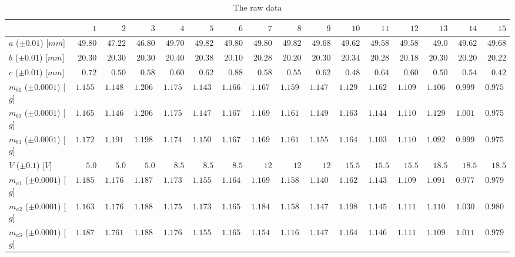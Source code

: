 \documentclass[a4paper]{article}
\begin{document}
\begin{landscape}

  \begin{table}
    \centering
    \begin{tabular}{l | r | r | r | r | r | r | r | r | r | r | r | r | r | r | r}
       & $1$      & $2$      & $3$      & $4$      & $5$      & $6$      & $7$
       & $8$      & $9$      & $10$     & $11$     & $12$     & $13$     & $14$
       & $15$     \\ \hline \hline $a$ ($\pm 0.01$) [$\si{mm}$]     & $49.80$
       & $47.22$  & $46.80$  & $49.70$  & $49.82$  & $49.80$  & $49.80$  &
       $49.82$  & $49.68$  & $49.62$  & $49.58$  & $49.58$  & $49.0$   &
       $49.62$  & $49.68$  \\ $b$ ($\pm 0.01 $) [$\si{mm}$]    & $20.30$  &
       $20.30$  & $20.30$ & $20.40$  & $20.38$  & $20.10$  & $20.28$  & $20.20$
       & $20.30$  & $20.34$ & $20.28$  & $20.18$  & $20.30$  & $20.20$  &
       $20.22$  \\ $c$ ($\pm 0.01$) [$\si{mm}$]     & $0.72$   & $0.50$   &
       $0.58$   & $0.60$   & $0.62$   & $0.88$   & $0.58$   & $0.55$   & $0.62$
       & $0.48$   & $0.64$   & $0.60$   & $0.50$   & $0.54$   & $0.42$   \\
       $m_{b1}$ ($\pm 0.0001$) [$\si{g}$] & $1.1555$ & $1.1482$ & $1.2061$ &
       $1.1753$ & $1.1432$ & $1.1660$ & $1.1679$ & $1.1599$ & $1.1478$ &
       $1.1292$  & $1.1624$ & $1.1090$ & $1.1065$ & $0.9998$ & $0.9758$ \\
       $m_{b2}$ ($\pm 0.0001$) [$\si{g}$] & $1.1651$ & $1.1462$ & $1.2064$ &
       $1.1752$ & $1.1478$ & $1.1671$ & $1.1697$ & $1.1614$ & $1.1492$ &
       $1.1639$ & $1.1446$ & $1.1107$ & $1.1294$ & $1.0014$ & $0.9759$ \\
       $m_{b3}$ ($\pm 0.0001$) [$\si{g}$] & $1.1720$ & $1.1919$ & $1.1987$ &
       $1.1746$ & $1.1505$ & $1.1673$ & $1.1695$ & $1.1614$ & $1.1559$ &
       $1.1643$ & $1.1034$ & $1.1104$ & $1.0921$ & $0.9996$ & $0.9759$ \\ $V$
       ($\pm 0.1$) [$\si{V}$] & $5.0$    & $5.0$    & $5.0$    & $8.5$    &
       $8.5$    & $8.5$    & $12$ & $12$     & $12$     & $15.5$   & $15.5$   &
       $15.5$   & $18.5$   & $18.5$ & $18.5$   \\ $m_{a1}$ ($\pm 0.0001$)
       [$\si{g}$] & $1.1851$ & $1.1767$ & $1.1875$ & $1.1734$ & $1.1555$ &
       $1.1644$ & $1.1691$ & $1.1582$ & $1.1401$ & $1.1623$ & $1.1431$ &
       $1.1098$ & $1.0910$ & $0.9771$ & $0.9794$ \\ $m_{a2}$ ($\pm 0.0001$)
       [$\si{g}$] & $1.1636$ & $1.1768$ & $1.1888$ & $1.1750$ & $1.1736$ &
       $1.1657$ & $1.1843$ & $1.1588$ & $1.1478$ & $1.1986$ & $1.1450$ &
       $1.1115$ & $1.1106$ & $1.0306$ & $0.9800$ \\ $m_{a3}$ ($\pm 0.0001$)
       [$\si{g}$] & $1.1876$ & $1.7610$ & $1.1887$ & $1.1762$ & $1.1558$ &
       $1.1659$ & $1.1540$ & $1.1161$ & $1.1478$ & $1.1640$ & $1.1467$ &
       $1.1117$ & $1.1098$ & $1.0111$ & $0.9794$ \\
    \end{tabular}
    \caption{The raw data}
    \label{tab:raw-data}
  \end{table}


\end{landscape}
\end{document}
